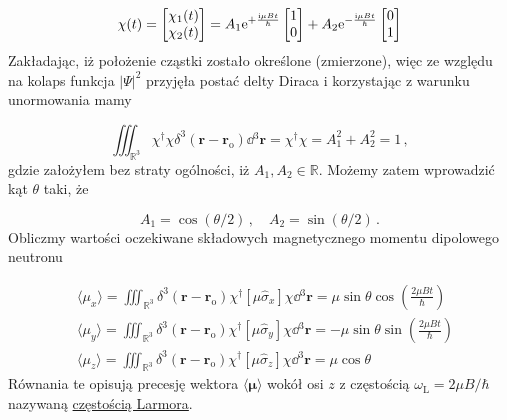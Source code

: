 \documentclass{myclass}
\begin{document}
\begin{equation*}
\chi(t)=\begin{bmatrix}
\chi_1(t)\\
\chi_2(t)
\end{bmatrix}=
A_1\mathrm{e}^{+\frac{\mathrm{i}\mu Bt}{\hbar}}
\begin{bmatrix}
1\\0
\end{bmatrix}+A_2\mathrm{e}^{-\frac{\mathrm{i}\mu Bt}{\hbar}}
\begin{bmatrix}
0\\1
\end{bmatrix}
\end{equation*}
Zakładając, iż położenie cząstki zostało określone (zmierzone), więc ze względu na kolaps funkcja
\(|\Psi|^2\) przyjęła postać delty Diraca i korzystając z warunku unormowania mamy

\begin{equation*}
\iiint_{\mathbb{R}^3}\chi^\dag\chi\delta^3(\mathbf{r}-\mathbf{r}_\text{o})\dd{^3\mathbf{r}}=\chi^\dag\chi=A_1^2+A_2^2=1\,,
\end{equation*}
gdzie założyłem bez straty ogólności, iż \(A_1,A_2\in\mathbb{R}\). Możemy zatem wprowadzić kąt
\(\theta\) taki, że

\begin{equation*}
A_1=\cos(\theta/2)\,,\quad A_2=\sin(\theta/2)\,.
\end{equation*}
Obliczmy wartości oczekiwane składowych magnetycznego momentu dipolowego neutronu

\begin{equation*}
\begin{split}
    &\langle\mu_x\rangle=\iiint_{\mathbb{R}^3}\delta^3(\mathbf{r}-\mathbf{r}_\text{o})\chi^\dag[\mu\hat{\sigma}_x]\chi\dd{^3\mathbf{r}}=\mu\sin\theta\cos\left(\frac{2\mu Bt}{\hbar}\right)\\
    &\langle\mu_y\rangle=\iiint_{\mathbb{R}^3}\delta^3(\mathbf{r}-\mathbf{r}_\text{o})\chi^\dag[\mu\hat{\sigma}_y]\chi\dd{^3\mathbf{r}}=-\mu\sin\theta\sin\left(\frac{2\mu Bt}{\hbar}\right)\\
    &\langle\mu_z\rangle=\iiint_{\mathbb{R}^3}\delta^3(\mathbf{r}-\mathbf{r}_\text{o})\chi^\dag[\mu\hat{\sigma}_z]\chi\dd{^3\mathbf{r}}=\mu\cos\theta
\end{split}
\end{equation*}
Równania te opisują precesję wektora \(\langle\boldsymbol{\mu}\rangle\) wokół osi \(z\) z częstością
\(\boxed{\omega_\text{L}=2\mu B/\hbar}\) nazywaną \underline{częstością Larmora}.
\end{document}
